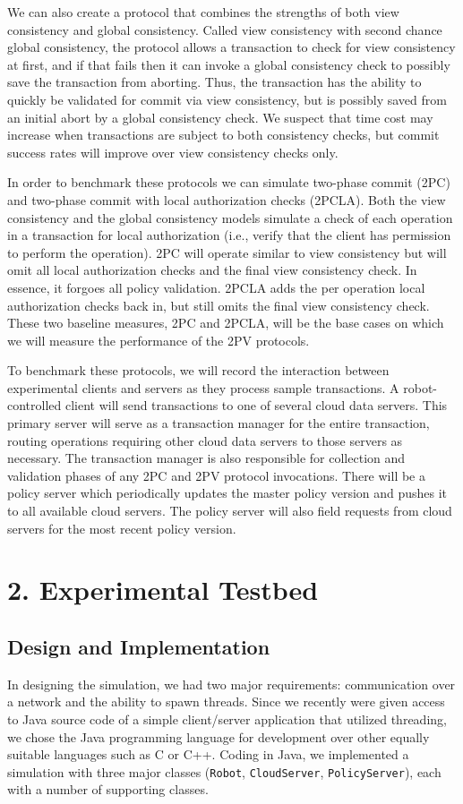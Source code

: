 \documentclass[11pt]{article}
\begin{document}
We can also create a protocol that combines the strengths of both view consistency and global consistency. Called view consistency with second chance global consistency, the protocol allows a transaction to check for view consistency at first, and if that fails then it can invoke a global consistency check to possibly save the transaction from aborting. Thus, the transaction has the ability to quickly be validated for commit via view consistency, but is possibly saved from an initial abort by a global consistency check. We suspect that time cost may increase when transactions are subject to both consistency checks, but commit success rates will improve over view consistency checks only.

In order to benchmark these protocols we can simulate two-phase commit (2PC) and two-phase commit with local authorization checks (2PCLA). Both the view consistency and the global consistency models simulate a check of each operation in a transaction for local authorization (i.e., verify that the client has permission to perform the operation). 2PC will operate similar to view consistency but will omit all local authorization checks and the final view consistency check. In essence, it forgoes all policy validation. 2PCLA adds the per operation local authorization checks back in, but still omits the final view consistency check. These two baseline measures, 2PC and 2PCLA, will be the base cases on which we will measure the performance of the 2PV protocols.

To benchmark these protocols, we will record the interaction between experimental clients and servers as they process sample transactions. A robot-controlled client will send transactions to one of several cloud data servers. This primary server will serve as a transaction manager for the entire transaction, routing operations requiring other cloud data servers to those servers as necessary. The transaction manager is also responsible for collection and validation phases of any 2PC and 2PV protocol invocations. There will be a policy server which periodically updates the master policy version and pushes it to all available cloud servers. The policy server will also field requests from cloud servers for the most recent policy version.
\section{2. Experimental Testbed}
\subsection{Design and Implementation}
In designing the simulation, we had two major requirements: communication over a network and the ability to spawn threads. Since we recently were given access to Java source code of a simple client/server application that utilized threading, we chose the Java programming language for development over other equally suitable languages such as C or C++. Coding in Java, we implemented a simulation with three major classes (\texttt{Robot}, \texttt{CloudServer}, \texttt{PolicyServer}), each with a number of supporting classes.
\end{document}
